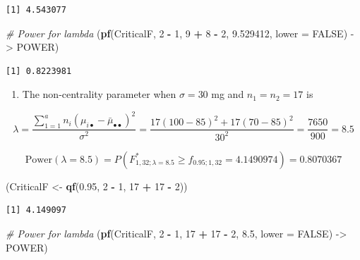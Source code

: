 \documentclass[
]{article}
\newenvironment{Shaded}{\begin{snugshade}}{\end{snugshade}}
\newcommand{\AttributeTok}[1]{\textcolor[rgb]{0.13,0.29,0.53}{#1}}
\newcommand{\CommentTok}[1]{\textcolor[rgb]{0.56,0.35,0.01}{\textit{#1}}}
\newcommand{\ConstantTok}[1]{\textcolor[rgb]{0.56,0.35,0.01}{#1}}
\newcommand{\DecValTok}[1]{\textcolor[rgb]{0.00,0.00,0.81}{#1}}
\newcommand{\FloatTok}[1]{\textcolor[rgb]{0.00,0.00,0.81}{#1}}
\newcommand{\FunctionTok}[1]{\textcolor[rgb]{0.13,0.29,0.53}{\textbf{#1}}}
\newcommand{\NormalTok}[1]{#1}
\newcommand{\OtherTok}[1]{\textcolor[rgb]{0.56,0.35,0.01}{#1}}
\newcommand{\SpecialCharTok}[1]{\textcolor[rgb]{0.81,0.36,0.00}{\textbf{#1}}}
\providecommand{\tightlist}{%
  \setlength{\itemsep}{0pt}\setlength{\parskip}{0pt}}
\begin{document}
\begin{verbatim}
[1] 4.543077
\end{verbatim}

\begin{Shaded}
\begin{Highlighting}[]
\CommentTok{\# Power for lambda}
\NormalTok{(}\FunctionTok{pf}\NormalTok{(CriticalF, }\DecValTok{2} \SpecialCharTok{{-}} \DecValTok{1}\NormalTok{, }\DecValTok{9} \SpecialCharTok{+} \DecValTok{8} \SpecialCharTok{{-}} \DecValTok{2}\NormalTok{, }\FloatTok{9.529412}\NormalTok{, }\AttributeTok{lower =} \ConstantTok{FALSE}\NormalTok{) }\OtherTok{{-}\textgreater{}}\NormalTok{ POWER)}
\end{Highlighting}
\end{Shaded}

\begin{verbatim}
[1] 0.8223981
\end{verbatim}

\begin{enumerate}
\def\labelenumi{\alph{enumi})}
\setcounter{enumi}{5}
\tightlist
\item
  The non-centrality parameter when \(\sigma = 30\) mg and \(n_1 = n_2 = 17\) is
\end{enumerate}

\begin{equation*}
\lambda = \frac{\sum_{1 = 1}^an_i(\mu_{i\bullet} - \bar{\mu}_{\bullet\bullet})^2}{\sigma^2} = \frac{17(100 - 85)^2 + 17(70 - 85)^2}{30^2} = \frac{7650}{900} = 8.5
\end{equation*}

\[\text{Power}(\lambda = 8.5) = P(F^*_{1, 32; \lambda = 8.5} \geq f_{0.95; 1, 32} = 4.1490974) = 0.8070367\]

\begin{Shaded}
\begin{Highlighting}[]
\NormalTok{(CriticalF }\OtherTok{\textless{}{-}} \FunctionTok{qf}\NormalTok{(}\FloatTok{0.95}\NormalTok{, }\DecValTok{2} \SpecialCharTok{{-}} \DecValTok{1}\NormalTok{, }\DecValTok{17} \SpecialCharTok{+} \DecValTok{17} \SpecialCharTok{{-}} \DecValTok{2}\NormalTok{))}
\end{Highlighting}
\end{Shaded}

\begin{verbatim}
[1] 4.149097
\end{verbatim}

\begin{Shaded}
\begin{Highlighting}[]
\CommentTok{\# Power for lambda}
\NormalTok{(}\FunctionTok{pf}\NormalTok{(CriticalF, }\DecValTok{2} \SpecialCharTok{{-}} \DecValTok{1}\NormalTok{, }\DecValTok{17} \SpecialCharTok{+} \DecValTok{17} \SpecialCharTok{{-}} \DecValTok{2}\NormalTok{, }\FloatTok{8.5}\NormalTok{, }\AttributeTok{lower =} \ConstantTok{FALSE}\NormalTok{) }\OtherTok{{-}\textgreater{}}\NormalTok{ POWER)}
\end{Highlighting}
\end{Shaded}
\end{document}
